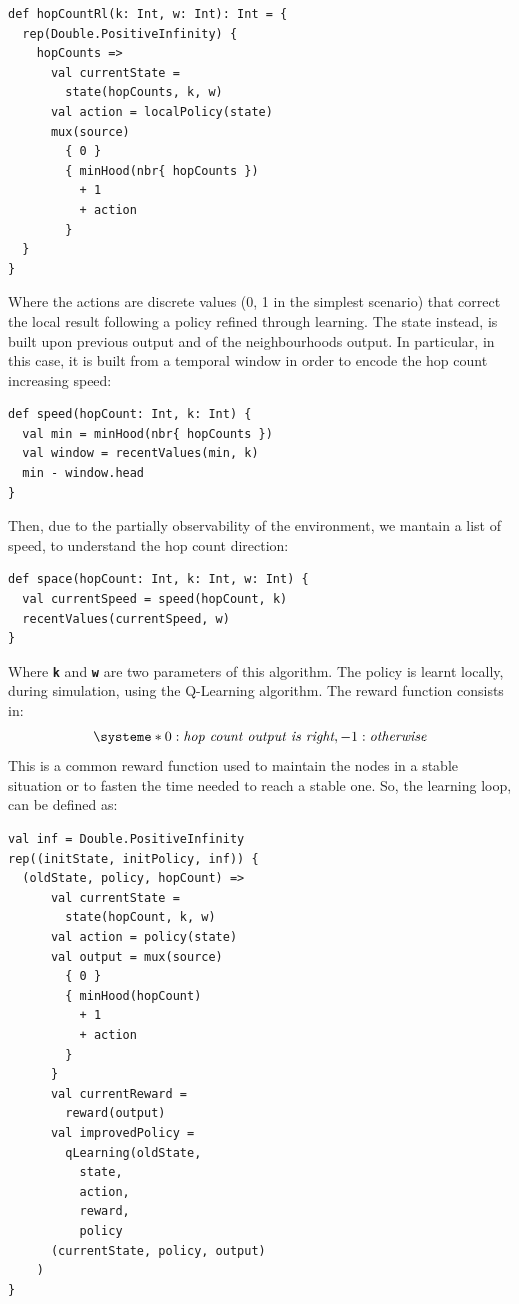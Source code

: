 \documentclass[
  twocolumn,
]{ceurart}
\begin{document}
 \begin{verbatim}
def hopCountRl(k: Int, w: Int): Int = {
  rep(Double.PositiveInfinity) { 
    hopCounts => 
      val currentState = 
        state(hopCounts, k, w)
      val action = localPolicy(state)
      mux(source) 
        { 0 } 
        { minHood(nbr{ hopCounts }) 
          + 1 
          + action
        } 
  }
}
\end{verbatim}

Where the actions are discrete values (0, 1 in the simplest scenario) that correct the local result following a policy refined through learning.
%
The state instead, is built upon previous output and of the neighbourhoods output.
 In particular, in this case, it is built from a temporal window in order to encode the hop count increasing speed:
\begin{verbatim}
def speed(hopCount: Int, k: Int) {
  val min = minHood(nbr{ hopCounts })
  val window = recentValues(min, k)
  min - window.head 
}
\end{verbatim}
Then, due to the partially observability of the environment, we mantain a 
 list of speed, to understand the hop count direction:

 \begin{verbatim}
def space(hopCount: Int, k: Int, w: Int) {
  val currentSpeed = speed(hopCount, k)
  recentValues(currentSpeed, w)
}
\end{verbatim}

Where \textbf{\texttt{k}} and \textbf{\texttt{w}} are two parameters of this algorithm.
%
The policy is learnt locally, during simulation, using the Q-Learning algorithm. 
 The reward function consists in: 
\[
\systeme*{0 : \textit{hop count output is right}, -1 : \textit{otherwise}}
\]
This is a common reward function used to maintain the nodes in a stable situation or to
 fasten the time needed to reach a stable one.
%
So, the learning loop, can be defined as:
\begin{verbatim}
val inf = Double.PositiveInfinity
rep((initState, initPolicy, inf)) {
  (oldState, policy, hopCount) => 
      val currentState = 
        state(hopCount, k, w)
      val action = policy(state)
      val output = mux(source) 
        { 0 } 
        { minHood(hopCount) 
          + 1 
          + action
        } 
      }
      val currentReward = 
        reward(output)
      val improvedPolicy = 
        qLearning(oldState, 
          state, 
          action, 
          reward,
          policy
      (currentState, policy, output)
    )
}
\end{verbatim}
\end{document}
